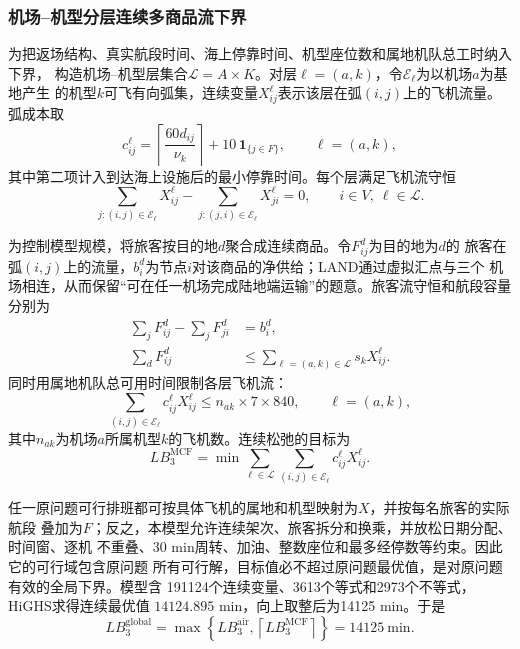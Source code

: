 \documentclass[UTF8,a4paper,zihao=5]{ctexart}
\begin{document}
\subsubsection{机场--机型分层连续多商品流下界}

为把返场结构、真实航段时间、海上停靠时间、机型座位数和属地机队总工时纳入下界，
构造机场--机型层集合$\mathcal{L}=A\times K$。对层$\ell=(a,k)$，令$\mathcal{E}_\ell$为以机场$a$为基地产生
的机型$k$可飞有向弧集，连续变量$X_{ij}^{\ell}$表示该层在弧$(i,j)$上的飞机流量。弧成本取
\begin{equation}
  c_{ij}^{\ell}=\left\lceil\frac{60d_{ij}}{\nu_k}\right\rceil
  +10\,\mathbf{1}_{\{j\in F\}},
  \qquad \ell=(a,k),
  \label{eq:q3-layered-arc-cost}
\end{equation}
其中第二项计入到达海上设施后的最小停靠时间。每个层满足飞机流守恒
\begin{equation}
  \sum_{j:(i,j)\in \mathcal{E}_\ell}X_{ij}^{\ell}
  -\sum_{j:(j,i)\in \mathcal{E}_\ell}X_{ji}^{\ell}=0,
  \qquad i\in V,\ \ell\in \mathcal{L}.
  \label{eq:q3-layered-aircraft-balance}
\end{equation}

为控制模型规模，将旅客按目的地$d$聚合成连续商品。令$F_{ij}^{d}$为目的地为$d$的
旅客在弧$(i,j)$上的流量，$b_i^d$为节点$i$对该商品的净供给；LAND通过虚拟汇点与三个
机场相连，从而保留“可在任一机场完成陆地端运输”的题意。旅客流守恒和航段容量分别为
\begin{align}
  \sum_jF_{ij}^{d}-\sum_jF_{ji}^{d}&=b_i^d,
  \label{eq:q3-passenger-flow-balance}\\
  \sum_dF_{ij}^{d}&\leq
  \sum_{\ell=(a,k)\in \mathcal{L}}s_kX_{ij}^{\ell}.
  \label{eq:q3-layered-seat-capacity}
\end{align}
同时用属地机队总可用时间限制各层飞机流：
\begin{equation}
  \sum_{(i,j)\in \mathcal{E}_\ell}c_{ij}^{\ell}X_{ij}^{\ell}
  \leq n_{ak}\times7\times840,
  \qquad \ell=(a,k),
  \label{eq:q3-layered-fleet-time}
\end{equation}
其中$n_{ak}$为机场$a$所属机型$k$的飞机数。连续松弛的目标为
\begin{equation}
  LB_3^{\mathrm{MCF}}
  =\min\sum_{\ell\in \mathcal{L}}\sum_{(i,j)\in \mathcal{E}_\ell}
  c_{ij}^{\ell}X_{ij}^{\ell}.
  \label{eq:q3-mcf-lower-bound}
\end{equation}

任一原问题可行排班都可按具体飞机的属地和机型映射为$X$，并按每名旅客的实际航段
叠加为$F$；反之，本模型允许连续架次、旅客拆分和换乘，并放松日期分配、时间窗、逐机
不重叠、30 min周转、加油、整数座位和最多经停数等约束。因此它的可行域包含原问题
所有可行解，目标值必不超过原问题最优值，是对原问题有效的全局下界。模型含
191124个连续变量、3613个等式和2973个不等式，HiGHS求得连续最优值
$14124.895$ min，向上取整后为14125 min。于是
\begin{equation}
  LB_3^{\mathrm{global}}
  =\max\left\{LB_3^{\mathrm{air}},\left\lceil LB_3^{\mathrm{MCF}}\right\rceil\right\}
  =14125\ \mathrm{min}.
  \label{eq:q3-enhanced-global-lb}
\end{equation}
\end{document}
